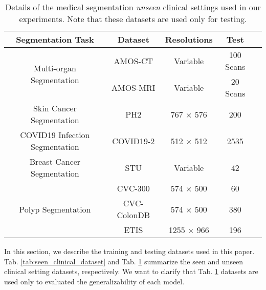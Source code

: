 \begin{table}[h]
    \centering
    \scriptsize
    \setlength\tabcolsep{3pt} %
    \begin{tabular}{c|c|ccc}
    \hline
    Segmentation Task &  Dataset  & Resolutions & Test \\
    \hline
    \multicolumn{1}{c|}{\multirow{2}{*}{Multi-organ Segmentation}} & AMOS-CT & Variable & 100 Scans \\
     & AMOS-MRI & Variable & 20 Scans \\
    \hline
    Skin Cancer Segmentation     & PH2   & 767 $\times$ 576  & 200  \\
    \hline
    COVID19 Infection Segmentation & COVID19-2   & 512 $\times$ 512  & 2535 \\
    \hline
    Breast Cancer Segmentation    & STU    & Variable          & 42	  \\
    \hline
    \multicolumn{1}{c|}{\multirow{3}{*}{Polyp Segmentation}} & CVC-300    & 574 $\times$ 500  & 60   \\
      & CVC-ColonDB    & 574 $\times$ 500  & 380  \\
      & ETIS    & 1255 $\times$ 966 & 196  \\
    \hline
    \end{tabular}
    \caption{Details of the medical segmentation \textit{unseen} clinical settings used in our experiments. Note that these datasets are used only for testing.}
    \label{tab:unseen_clinical_dataset}
\end{table}

In this section, we describe the training and testing datasets used in this paper. Tab. \ref{tab:seen_clinical_dataset} and Tab. \ref{tab:unseen_clinical_dataset} summarize the seen and unseen clinical setting datasets, respectively. We want to clarify that Tab. \ref{tab:unseen_clinical_dataset} datasets are used only to evaluated the generalizability of each model.

